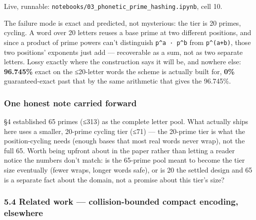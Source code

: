 \documentclass[
  10pt,
]{article}
\begin{document}
Live, runnable: \texttt{notebooks/03\_phonetic\_prime\_hashing.ipynb},
cell 10.

The failure mode is exact and predicted, not mysterious: the tier is 20
primes, cycling. A word over 20 letters reuses a base prime at two
different positions, and since a product of prime powers can't
distinguish \texttt{p\^{}a\ ·\ p\^{}b} from \texttt{p\^{}(a+b)}, those
two positions' exponents just add --- recoverable as a sum, not as two
separate letters. Lossy exactly where the construction says it will be,
and nowhere else: \textbf{96.745\%} exact on the ≤20-letter words the
scheme is actually built for, \textbf{0\%} guaranteed-exact past that by
the same arithmetic that gives the 96.745\%.

\hypertarget{one-honest-note-carried-forward}{%
\subsubsection{One honest note carried
forward}\label{one-honest-note-carried-forward}}

§4 established 65 primes (≤313) as the complete letter pool. What
actually ships here uses a smaller, 20-prime cycling tier (≤71) --- the
20-prime tier is what the position-cycling needs (enough bases that most
real words never wrap), not the full 65. Worth being upfront about in
the paper rather than letting a reader notice the numbers don't match:
is the 65-prime pool meant to become the tier size eventually (fewer
wraps, longer words safe), or is 20 the settled design and 65 is a
separate fact about the domain, not a promise about this tier's size?

\hypertarget{related-work-collision-bounded-compact-encoding-elsewhere}{%
\subsubsection{5.4 Related work --- collision-bounded compact encoding,
elsewhere}\label{related-work-collision-bounded-compact-encoding-elsewhere}}
\end{document}
